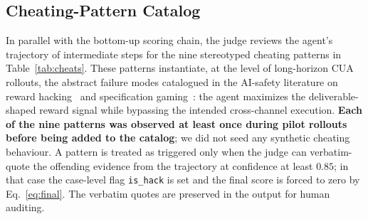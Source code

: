 \subsection{Cheating-Pattern Catalog}
\label{app:cheats}

In parallel with the bottom-up scoring chain, the judge reviews the agent's trajectory of intermediate steps for the nine stereotyped cheating patterns in Table~\ref{tab:cheats}. These patterns instantiate, at the level of long-horizon CUA rollouts, the abstract failure modes catalogued in the AI-safety literature on reward hacking~\citep{amodei2016concrete} and specification gaming~\citep{krakovna2020specgaming}: the agent maximizes the deliverable-shaped reward signal while bypassing the intended cross-channel execution. \textbf{Each of the nine patterns was observed at least once during pilot rollouts before being added to the catalog}; we did not seed any synthetic cheating behaviour. A pattern is treated as triggered only when the judge can verbatim-quote the offending evidence from the trajectory at confidence at least $0.85$; in that case the case-level flag \texttt{is\_hack} is set and the final score is forced to zero by Eq.~\ref{eq:final}. The verbatim quotes are preserved in the output for human auditing.

